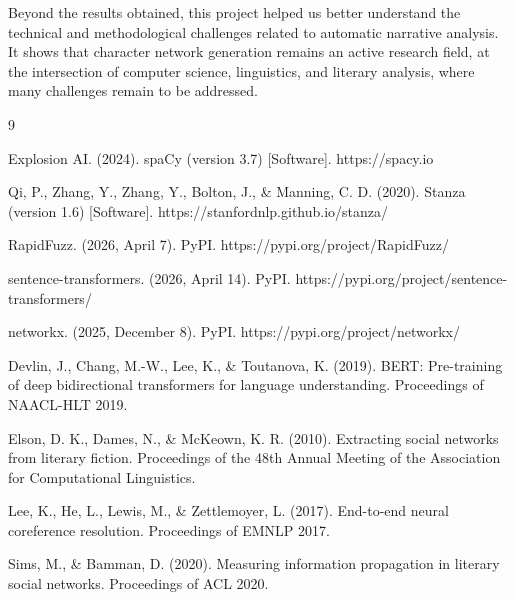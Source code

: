 \documentclass[a4paper]{article}
\begin{document}
Beyond the results obtained, this project helped us better understand the technical and methodological challenges related to automatic narrative analysis. It shows that character network generation remains an active research field, at the intersection of computer science, linguistics, and literary analysis, where many challenges remain to be addressed.

\begin{thebibliography}{9}

Explosion AI. (2024). spaCy (version 3.7) [Software]. https://spacy.io

Qi, P., Zhang, Y., Zhang, Y., Bolton, J., \& Manning, C. D. (2020). Stanza (version 1.6) [Software]. https://stanfordnlp.github.io/stanza/

RapidFuzz. (2026, April 7). PyPI. https://pypi.org/project/RapidFuzz/

sentence-transformers. (2026, April 14). PyPI. https://pypi.org/project/sentence-transformers/

networkx. (2025, December 8). PyPI. https://pypi.org/project/networkx/

Devlin, J., Chang, M.-W., Lee, K., \& Toutanova, K. (2019). BERT: Pre-training of deep bidirectional transformers for language understanding. Proceedings of NAACL-HLT 2019.

Elson, D. K., Dames, N., \& McKeown, K. R. (2010). Extracting social networks from literary fiction. Proceedings of the 48th Annual Meeting of the Association for Computational Linguistics.

Lee, K., He, L., Lewis, M., \& Zettlemoyer, L. (2017). End-to-end neural coreference resolution. Proceedings of EMNLP 2017.

Sims, M., \& Bamman, D. (2020). Measuring information propagation in literary social networks. Proceedings of ACL 2020.

\end{thebibliography}
\end{document}
